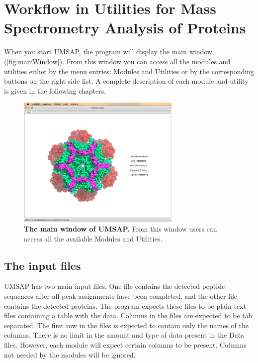 \chapter{Workflow in Utilities for Mass Spectrometry Analysis of Proteins}
\label{chap:workflow}

When you start UMSAP, the program will display the main window (\autoref{fig:mainWindow}).
From this window you can access all the modules and utilities either by the menu
entries: Modules and Utilities or by the corresponding buttons on the right side
list. A complete description of each module and utility is given in the following
chapters.

\begin{figure}[h]
    \centering
    \includegraphics[width=0.7\textwidth]{./IMAGES/MAIN-WINDOW/mainwindow.jpg}
    \caption[The main window of UMSAP]{\textbf{The main window of UMSAP.} From
this window users can access all the available Modules and Utilities.} 
    \label{fig:mainWindow}
    \vspace{-5pt}
\end{figure}  

\section{The input files}
\label{sec:dataFile}

UMSAP has two main input files. One file contains the detected peptide sequences
after all peak assignments have been completed, and the other file contains the
detected proteins. The program expects these files to be plain text files containing
a table with the data. Columns in the files are expected to be tab separated. The
first row in the files is expected to contain only the names of the columns. There
is no limit in the amount and type of data present in the Data files. However, each
module will expect certain columns to be present. Columns not needed by the modules
will be ignored.

